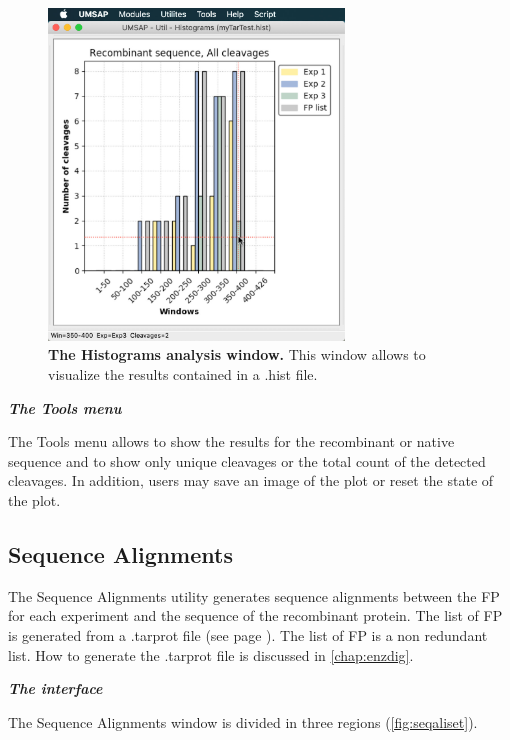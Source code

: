\begin{figure}[h]
	\centering
	\includegraphics[width=0.7\textwidth]{./IMAGES/UTIL-HIST-WINDOW/util-histo-res.jpg}	    
	\caption[The Histograms analysis window]{\textbf{The Histograms analysis window.} This window allows to visualize the results contained in a .hist file.} 
	\label{fig:histoshwo}
	\vspace{-5pt} 	
\end{figure}

\textit{\textbf{The Tools menu}}

The Tools menu allows to show the results for the recombinant or native sequence and to show only unique cleavages or the total count of the detected cleavages. In addition, users may save an image of the plot or reset the state of the plot.

\subsection{Sequence Alignments}
\label{subsec:seqali}
The Sequence Alignments utility generates sequence alignments between the FP for each experiment and the sequence of the recombinant protein. The list of FP is generated from a .tarprot file (see page \pageref{par:PIP}). The list of FP is a non redundant list. How to generate the .tarprot file is discussed in \autoref{chap:enzdig}.

\textit{\textbf{The interface}}

The Sequence Alignments window is divided in three regions (\autoref{fig:seqaliset}).


